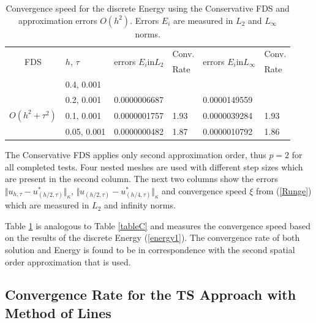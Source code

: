 \documentclass[%
 aip,
cp,  
 amsmath,amssymb,
 reprint,
]{iopconfser}
\newcommand{\rf}[1]{(\ref{#1})}
\begin{document}
\begin{table}[ht]
\centering
\small
		\begin{tabular}{||c|l|ll|ll||}
			\hline
			\hline
      \multirow{2  }{*}{FDS}        & \multirow{2  }{*}{$h$, $\tau$}  & \multirow{2  }{*}{errors $E_i$in$L_2$}  &Conv.& \multirow{2  }{*}{errors $E_i$in$L_\infty$}  &Conv.  \\
	                                        &                                                     &                                                                 &  Rate &                                                                       & Rate \\
   			\hline 
					\hline 
                                   &0.4, 0.001         &                    &                &                  &                   \\
                                   &0.2, 0.001        & 0.0000006687  &                & 0.0000149559   &                   \\
     $O(h^2 + \tau^ 2)$ &0.1, 0.001      & 0.0000001757   & 1.93       & 0.0000039284 & 1.93   \\
                                     &0.05, 0.001  & 0.0000000482   & 1.87       & 0.0000010792  & 1.86   \\
	   \hline
			\hline 
		\end{tabular}
		\caption{ Convergence speed for the discrete Energy using the Conservative FDS and approximation errors $O(h^{2})$. Errors $E_i$ are measured in $L_2$ and $L_\infty$ norms. }
\label{tableD}
\end{table}
The Conservative FDS applies only second approximation order, thus $p=2$ for all completed tests. Four nested meshes are used with different step sizes which are present in the second column. The next two columns show the errors $\Vert u_{h,\tau} - u^*_{(h/2,\tau)} \Vert_\kappa$, $\Vert  u_{(h/2,\tau)} - u^*_{(h/4,\tau)} \Vert_\kappa$ and convergence speed $\xi$ from \rf{Runge} which are measured in $L_2$ and infinity norms. 

Table \ref{tableD} is analogous to Table \ref{tableC} and measures the convergence speed based on the results of the discrete Energy \rf{energy1}. The convergence rate of both solution and Energy is found to be in correspondence with the second spatial order approximation that is used.

\subsection{Convergence Rate for the TS Approach with Method of Lines}
\end{document}
